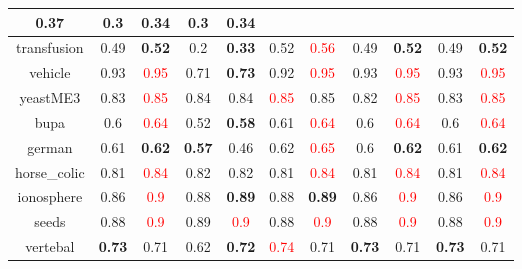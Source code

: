 \documentclass{article}%
\begin{document}
\begin{tabular}{c|cccccccccc}
{0.37
}&0.3&\textbf{0.34}&0.3&\textbf{0.34}\\%
\hline%
transfusion&0.49&\textbf{0.52}&0.2&\textbf{0.33}&0.52&\textcolor{red}{ 
0.56
}&0.49&\textbf{0.52}&0.49&\textbf{0.52}\\%
\hline%
vehicle&0.93&\textcolor{red}{ 
0.95
}&0.71&\textbf{0.73}&0.92&\textcolor{red}{ 
0.95
}&0.93&\textcolor{red}{ 
0.95
}&0.93&\textcolor{red}{ 
0.95
}\\%
\hline%
yeastME3&0.83&\textcolor{red}{ 
0.85
}&0.84&0.84&\textcolor{red}{ 
0.85
}&0.85&0.82&\textcolor{red}{ 
0.85
}&0.83&\textcolor{red}{ 
0.85
}\\%
\hline%
bupa&0.6&\textcolor{red}{ 
0.64
}&0.52&\textbf{0.58}&0.61&\textcolor{red}{ 
0.64
}&0.6&\textcolor{red}{ 
0.64
}&0.6&\textcolor{red}{ 
0.64
}\\%
\hline%
german&0.61&\textbf{0.62}&\textbf{0.57}&0.46&0.62&\textcolor{red}{ 
0.65
}&0.6&\textbf{0.62}&0.61&\textbf{0.62}\\%
\hline%
horse\_colic&0.81&\textcolor{red}{ 
0.84
}&0.82&0.82&0.81&\textcolor{red}{ 
0.84
}&0.81&\textcolor{red}{ 
0.84
}&0.81&\textcolor{red}{ 
0.84
}\\%
\hline%
ionosphere&0.86&\textcolor{red}{ 
0.9
}&0.88&\textbf{0.89}&0.88&\textbf{0.89}&0.86&\textcolor{red}{ 
0.9
}&0.86&\textcolor{red}{ 
0.9
}\\%
\hline%
seeds&0.88&\textcolor{red}{ 
0.9
}&0.89&\textcolor{red}{ 
0.9
}&0.88&\textcolor{red}{ 
0.9
}&0.88&\textcolor{red}{ 
0.9
}&0.88&\textcolor{red}{ 
0.9
}\\%
\hline%
vertebal&\textbf{0.73}&0.71&0.62&\textbf{0.72}&\textcolor{red}{ 
0.74
}&0.71&\textbf{0.73}&0.71&\textbf{0.73}&0.71\\%
\hline%
\end{tabular}

%
\end{document}
